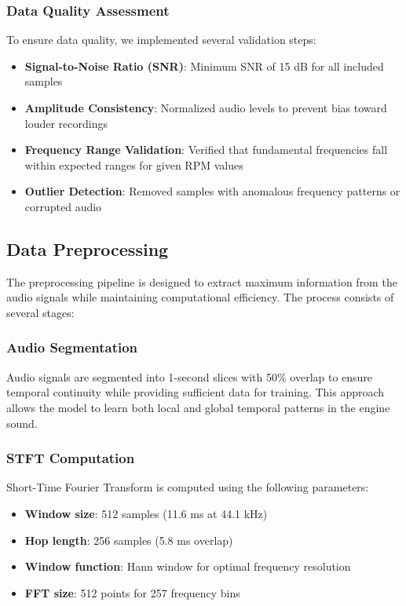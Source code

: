 \documentclass[journal,10pt]{IEEEtran}
\begin{document}
\subsubsection{Data Quality Assessment}

To ensure data quality, we implemented several validation steps:
\begin{itemize}
    \item \textbf{Signal-to-Noise Ratio (SNR)}: Minimum SNR of 15 dB for all included samples
    \item \textbf{Amplitude Consistency}: Normalized audio levels to prevent bias toward louder recordings
    \item \textbf{Frequency Range Validation}: Verified that fundamental frequencies fall within expected ranges for given RPM values
    \item \textbf{Outlier Detection}: Removed samples with anomalous frequency patterns or corrupted audio
\end{itemize}

\subsection{Data Preprocessing}

The preprocessing pipeline is designed to extract maximum information from the audio signals while maintaining computational efficiency. The process consists of several stages:

\subsubsection{Audio Segmentation}

Audio signals are segmented into 1-second slices with 50\% overlap to ensure temporal continuity while providing sufficient data for training. This approach allows the model to learn both local and global temporal patterns in the engine sound.

\subsubsection{STFT Computation}

Short-Time Fourier Transform is computed using the following parameters:
\begin{itemize}
    \item \textbf{Window size}: 512 samples (11.6 ms at 44.1 kHz)
    \item \textbf{Hop length}: 256 samples (5.8 ms overlap)
    \item \textbf{Window function}: Hann window for optimal frequency resolution
    \item \textbf{FFT size}: 512 points for 257 frequency bins
\end{itemize}
\end{document}
